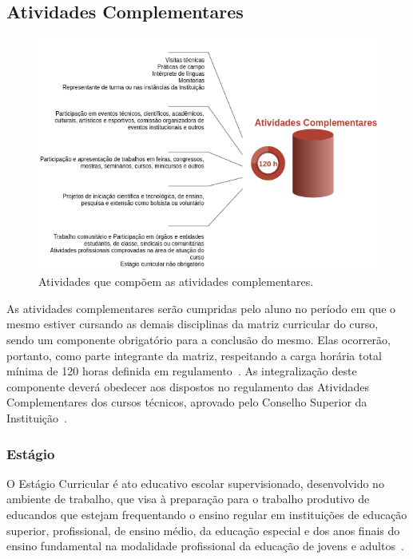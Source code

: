 \documentclass[11pt,fleqn]{book} %
\begin{document}
\subsection{Atividades Complementares}\label{atividadescomplementares}
\indent

\begin{figure}[!htp]
	\centering	
	\includegraphics[width=.9\textwidth]{Pictures/AtividadesComplementares.png}
	\caption{Atividades que compõem as atividades complementares.}
	\label{fig:AtividadesComplementares}
\end{figure}

As atividades complementares serão cumpridas pelo aluno no período em que o mesmo estiver cursando as demais disciplinas da matriz curricular do curso, sendo um componente obrigatório para a conclusão do mesmo.
Elas ocorrerão, portanto, como parte integrante da matriz, respeitando a carga horária total mínima de 120 horas definida em regulamento~\cite{Resolucao20De2011}.
As integralização deste componente deverá obedecer aos dispostos no regulamento das Atividades Complementares dos cursos técnicos, aprovado pelo Conselho Superior da Instituição~\cite{Resolucao20De2011}.

\subsubsection{Estágio}
\indent

O Estágio Curricular é ato educativo escolar supervisionado, desenvolvido no ambiente de trabalho, que visa à preparação para o trabalho produtivo de educandos que estejam frequentando o ensino regular em instituições de educação superior, profissional, de ensino médio, da educação especial e dos anos finais do ensino fundamental na modalidade profissional da educação de jovens e adultos~\cite{Lei11788De2008}.
\end{document}
